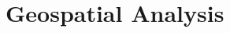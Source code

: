\documentclass[utf8]{frontiersHLTH}
\begin{document}

\section{Geospatial Analysis}\label{background} 
\end{document}
